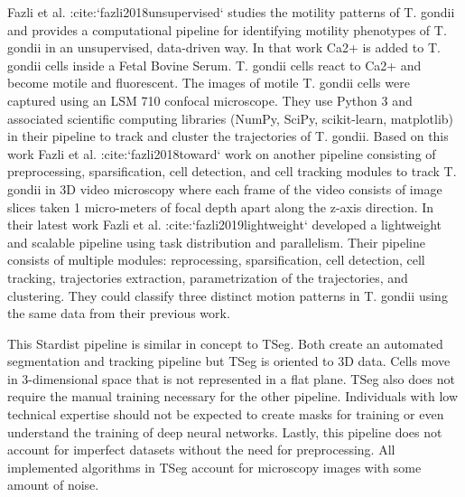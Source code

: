 \documentclass[./dissertation.tex]{subfiles}
\begin{document}
Fazli et al. :cite:`fazli2018unsupervised` studies the motility patterns of T. gondii and provides a computational pipeline for identifying motility phenotypes of T. gondii in an unsupervised, data-driven way. In that work Ca2+ is added to T. gondii cells inside a Fetal Bovine Serum. T. gondii cells react to Ca2+ and become motile and fluorescent. The images of motile T. gondii cells were captured using an LSM 710 confocal microscope. They use Python 3 and associated scientific computing libraries (NumPy, SciPy, scikit-learn, matplotlib) in their pipeline to track and cluster the trajectories of T. gondii. Based on this work Fazli et al. :cite:`fazli2018toward` work on another pipeline consisting of preprocessing, sparsification, cell detection, and cell tracking modules to track T. gondii in 3D video microscopy where each frame of the video consists of image slices taken 1 micro-meters of focal depth apart along the z-axis direction. In their latest work Fazli et al. :cite:`fazli2019lightweight` developed a lightweight and scalable pipeline using task distribution and parallelism. Their pipeline consists of multiple modules: reprocessing, sparsification, cell detection, cell tracking, trajectories extraction, parametrization of the trajectories, and clustering. They could classify three distinct motion patterns in T. gondii using the same data from their previous work.


This Stardist pipeline is similar in concept to TSeg. Both create an automated segmentation and tracking pipeline but TSeg is oriented to 3D data. Cells move in 3-dimensional space that is not represented in a flat plane. TSeg also does not require the manual training necessary for the other pipeline. Individuals with low technical expertise should not be expected to create masks for training or even understand the training of deep neural networks. Lastly, this pipeline does not account for imperfect datasets without the need for preprocessing. All implemented algorithms in TSeg account for microscopy images with some amount of noise.
\end{document}
